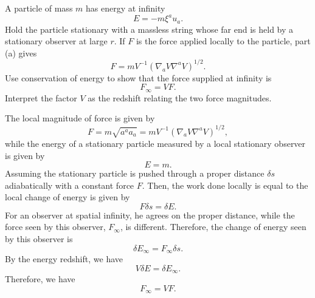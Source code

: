 \begin{enumerate}[label=\alph*)]
    A particle of mass $m$ has energy at infinity
    \begin{equation}
        E=-m\xi^a u_a.
    \end{equation}
    Hold the particle stationary with a massless string whose far end is held by
    a stationary observer at large $r$. If $F$ is the force applied locally to the
    particle, part (a) gives
    \begin{equation}
        F=mV^{-1}\left(\nabla_aV\nabla^aV\right)^{1/2}.
    \end{equation}
    Use conservation of energy to show that the force supplied at infinity is
    \begin{equation}
        F_\infty=VF.
    \end{equation}
    Interpret the factor $V$ as the redshift relating the two force magnitudes.
    \begin{solution}
        The local magnitude of force is given by
        \begin{equation}
            F = m \sqrt{a^a a_a} = mV^{-1}\left(\nabla_aV\nabla^aV\right)^{1/2},
        \end{equation}
        while the energy of a stationary particle measured by a local stationary observer is given by
        \begin{equation}
            E = m.
        \end{equation}
        Assuming the stationary particle is pushed through a proper distance $\delta s$ adiabatically with a constant force $F$. Then, the work done locally is equal to the local change of energy is given by
        \begin{equation}
            F\delta s = \delta E.
        \end{equation}
        For an observer at spatial infinity, he agrees on the proper distance, while the force seen by this observer, $F_\infty$, is different. Therefore, the change of energy seen by this observer is
        \begin{equation}
            \delta E_\infty = F_\infty \delta s.
        \end{equation}
        By the energy redshift, we have
        \begin{equation}
            V\delta E = \delta E_\infty.
        \end{equation}
        Therefore, we have
        \begin{equation}
            F_\infty =VF.
        \end{equation}
    \end{solution}
\end{enumerate}

